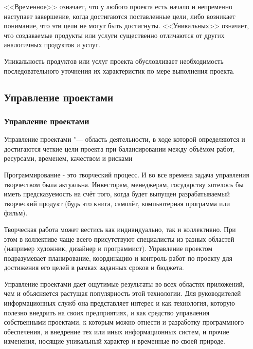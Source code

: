 \documentclass{../industrial-development}
\begin{document}
<<Временное>> означает, что у любого проекта есть начало и непременно наступает завершение, когда достигаются поставленные цели, либо возникает понимание, что эти цели не могут быть достигнуты. <<Уникальных>> означает, что создаваемые продукты или услуги существенно отличаются от других аналогичных продуктов и услуг.

Уникальность продуктов или услуг проекта обусловливает необходимость последовательного уточнения их характеристик по мере выполнения проекта.

  \subsection{Управление проектами}

    \begin{frame} \frametitle{Управление проектами}
        \begin{definition}
            \alert{Управление проектами} "--- область деятельности, в ходе которой определяются и достигаются \alert{четкие цели} проекта при балансировании между объёмом работ, ресурсами, временем, качеством и рисками
        \end{definition}
    \end{frame}
    \lecturenotes

Программирование - это творческий процесс. И во все времена задача управления творчеством была актуальна. Инвесторам, менеджерам, государству хотелось бы иметь предсказуемость на счёт того, когда будет выпущен разрабатываемый творческий продукт (будь это книга, самолёт, компьютерная программа или фильм).

Творческая работа может вестись как индивидуально, так и коллективно. При этом в коллективе чаще всего присутствуют специалисты из разных областей (например художник, дизайнер и программист). Управление проектом подразумевает планирование, координацию и контроль работ по проекту для достижения его целей в рамках заданных сроков и бюджета.

Управление проектами дает ощутимые результаты во всех областях приложений, чем и объясняется растущая популярность этой технологии. Для руководителей информационных служб она представляет интерес и как технология, которую полезно внедрить на своих предприятиях, и как средство управления собственными проектами, к которым можно отнести и разработку программного обеспечения, и внедрение тех или иных информационных систем, и прочие изменения, носящие уникальный характер и временные по своей природе.
\end{document}
